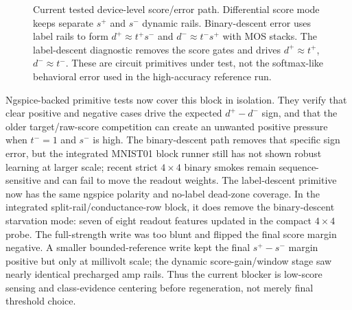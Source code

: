 \documentclass[11pt]{article}
\begin{document}
\begin{figure}[H]
{}
  \caption{Current tested device-level score/error path.  Differential score
  mode keeps separate \(s^+\) and \(s^-\) dynamic rails.  Binary-descent error
  uses label rails to form \(d^+\approx t^+s^-\) and \(d^-\approx t^-s^+\)
  with MOS stacks.  The label-descent diagnostic removes the score gates and
  drives \(d^+\approx t^+\), \(d^-\approx t^-\).  These are circuit primitives
  under test, not the softmax-like behavioral error used in the high-accuracy
  reference run.}
  \label{fig:binary-descent-error-path}
\end{figure}

Ngspice-backed primitive tests now cover this block in isolation.  They verify
that clear positive and negative cases drive the expected \(d^+-d^-\) sign, and
that the older target/raw-score competition can create an unwanted positive
pressure when \(t^-=1\) and \(s^-\) is high.  The binary-descent path removes
that specific sign error, but the integrated MNIST01 block runner still has not
shown robust learning at larger scale; recent strict \(4\times4\) binary
smokes remain sequence-sensitive and can fail to move the readout weights.
The label-descent primitive now has the same ngspice polarity and no-label
dead-zone coverage.  In the integrated split-rail/conductance-row block, it
does remove the binary-descent starvation mode: seven of eight readout features
updated in the compact \(4\times4\) probe.  The full-strength write was too
blunt and flipped the final score margin negative.  A smaller bounded-reference
write kept the final \(s^+-s^-\) margin positive but only at millivolt scale;
the dynamic score-gain/window stage saw nearly identical precharged amp rails.
Thus the current blocker is low-score sensing and class-evidence centering
before regeneration, not merely final threshold choice.
\end{document}

